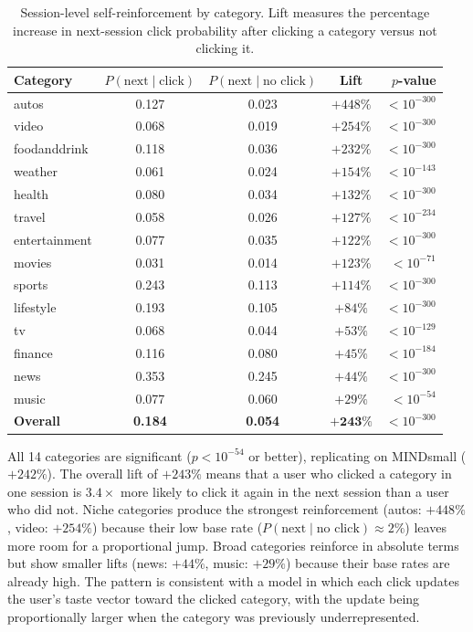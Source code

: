 \documentclass[11pt]{article}
\begin{document}
\begin{table}[ht]
\centering
\caption{Session-level self-reinforcement by category. Lift measures the percentage increase in next-session click probability after clicking a category versus not clicking it.}
\label{tab:selfreinforcement}
\small
\begin{tabular}{lcccr}
\toprule
Category & $P(\text{next} \mid \text{click})$ & $P(\text{next} \mid \text{no click})$ & Lift & $p$-value \\
\midrule
autos & 0.127 & 0.023 & $+448\%$ & $< 10^{-300}$ \\
video & 0.068 & 0.019 & $+254\%$ & $< 10^{-300}$ \\
foodanddrink & 0.118 & 0.036 & $+232\%$ & $< 10^{-300}$ \\
weather & 0.061 & 0.024 & $+154\%$ & $< 10^{-143}$ \\
health & 0.080 & 0.034 & $+132\%$ & $< 10^{-300}$ \\
travel & 0.058 & 0.026 & $+127\%$ & $< 10^{-234}$ \\
entertainment & 0.077 & 0.035 & $+122\%$ & $< 10^{-300}$ \\
movies & 0.031 & 0.014 & $+123\%$ & $< 10^{-71}$ \\
sports & 0.243 & 0.113 & $+114\%$ & $< 10^{-300}$ \\
lifestyle & 0.193 & 0.105 & $+84\%$ & $< 10^{-300}$ \\
tv & 0.068 & 0.044 & $+53\%$ & $< 10^{-129}$ \\
finance & 0.116 & 0.080 & $+45\%$ & $< 10^{-184}$ \\
news & 0.353 & 0.245 & $+44\%$ & $< 10^{-300}$ \\
music & 0.077 & 0.060 & $+29\%$ & $< 10^{-54}$ \\
\midrule
\textbf{Overall} & \textbf{0.184} & \textbf{0.054} & $\boldsymbol{+243\%}$ & $< 10^{-300}$ \\
\bottomrule
\end{tabular}
\end{table}
\FloatBarrier

All 14 categories are significant ($p < 10^{-54}$ or better), replicating on MINDsmall ($+242\%$). The overall lift of $+243\%$ means that a user who clicked a category in one session is $3.4\times$ more likely to click it again in the next session than a user who did not. Niche categories produce the strongest reinforcement (autos: $+448\%$, video: $+254\%$) because their low base rate ($P(\text{next} \mid \text{no click}) \approx 2\%$) leaves more room for a proportional jump. Broad categories reinforce in absolute terms but show smaller lifts (news: $+44\%$, music: $+29\%$) because their base rates are already high. The pattern is consistent with a model in which each click updates the user's taste vector toward the clicked category, with the update being proportionally larger when the category was previously underrepresented.
\end{document}
